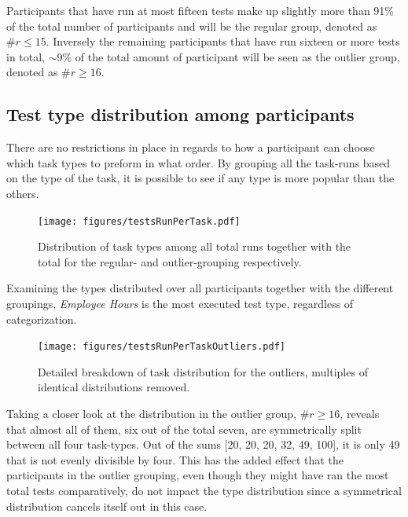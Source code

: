 \documentclass[nofilelist,dvipsnames]{cslthse-msc}
\begin{document}
{        Participants that have run at most fifteen tests make up slightly more
        than 91\% of the total number of participants and will be the regular
        group, denoted as $\#r\leq15$. Inversely the remaining participants
        that have run sixteen or more tests in total, $\sim$9\% of the total
        amount of participant will be seen as the outlier group, denoted as
        $\#r\geq16$.

      \subsection{Test type distribution among participants}

        There are no restrictions in place in regards to how a participant
        can choose which task types to preform in what order. By grouping all
        the task-runs based on the type of the task, it is possible to see if
        any type is more popular than the others.

				\begin{figure}[h!]
					\centering
					\texttt{[image: figures/testsRunPerTask.pdf]}
          \caption{
            Distribution of task types among all total runs together with the
            total for the regular- and outlier-grouping respectively.
          }
				\end{figure}

        Examining the types distributed over all participants together
        with the different groupings, \textit{Employee Hours} is the most
        executed test type, regardless of categorization.

				\begin{figure}[h!]
					\centering
					\texttt{[image: figures/testsRunPerTaskOutliers.pdf]}
          \caption{
            Detailed breakdown of task distribution for the outliers, multiples
            of identical distributions removed.
          }
          \label{label_testsRunPerTaskOutliers}
				\end{figure}

        Taking a closer look at the distribution in the outlier group,
        $\#r\geq16$, reveals that almost all of them, six out of the total seven,
        are symmetrically split between all four task-types. Out of the sums
        [20, 20, 20, 32, 49, 100], it is only 49 that is not evenly divisible
        by four. This has the added effect that the participants in the
        outlier grouping, even though they might have ran the most total tests
        comparatively, do not impact the type distribution since a symmetrical
        distribution cancels itself out in this case.

}
\end{document}
